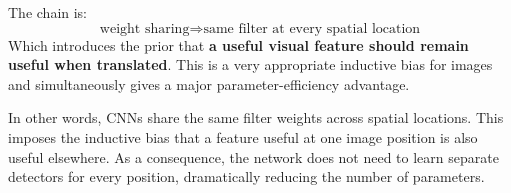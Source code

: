 \highspace
\begin{takeawaysbox}
    The chain is:
    \begin{equation*}
        \text{weight sharing} \Rightarrow \text{same filter at every spatial location}
    \end{equation*}
    Which introduces the prior that \textbf{a useful visual feature should remain useful when translated}. This is a very appropriate inductive bias for images and simultaneously gives a major parameter-efficiency advantage.

    \highspace
    In other words, CNNs share the same filter weights across spatial locations. This imposes the inductive bias that a feature useful at one image position is also useful elsewhere. As a consequence, the network does not need to learn separate detectors for every position, dramatically reducing the number of parameters.
\end{takeawaysbox}